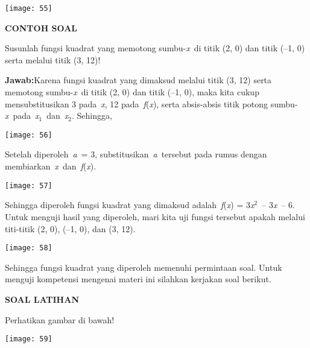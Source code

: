 \documentclass[11pt,fleqn]{book} %
\begin{document}
\begin{center}
\noindent \texttt{[image: 55]}
\end{center}

\noindent \textbf{CONTOH SOAL}

\noindent Susunlah fungsi kuadrat yang memotong sumbu-\textit{x}~di titik (2, 0) dan titik (--1, 0) serta melalui titik (3, 12)!

\noindent \textbf{Jawab:}Karena fungsi kuadrat yang dimaksud melalui titik (3, 12) serta memotong sumbu-\textit{x}~di titik (2, 0) dan titik (--1, 0), maka kita cukup mensubstitusikan 3 pada~\textit{x}, 12 pada~\textit{f}(\textit{x}), serta absis-absis titik potong sumbu-\textit{x}~pada~\textit{x}${}_{1}$~dan~\textit{x}${}_{2}$. Sehingga,

\begin{center}
\noindent \texttt{[image: 56]}
\end{center}

\noindent Setelah diperoleh~\textit{a}~= 3, substitusikan~\textit{a}~tersebut pada rumus dengan membiarkan~\textit{x}~dan~\textit{f}(\textit{x}).

\begin{center}
\noindent \texttt{[image: 57]}
\end{center}

\noindent Sehingga diperoleh fungsi kuadrat yang dimaksud adalah~\textit{f}(\textit{x}) = 3\textit{x}${}^{2}$~-- 3\textit{x}~-- 6. Untuk menguji hasil yang diperoleh, mari kita uji fungsi tersebut apakah melalui titi-titik (2, 0), (--1, 0), dan (3, 12).

\begin{center}
\noindent \texttt{[image: 58]}
\end{center}

\noindent Sehingga fungsi kuadrat yang diperoleh memenuhi permintaan soal. Untuk menguji kompetensi mengenai materi ini silahkan kerjakan soal berikut.

\noindent \textbf{SOAL LATIHAN}

\noindent Perhatikan gambar di bawah!

\begin{center}
\noindent \texttt{[image: 59]}
\end{center}
\end{document}
